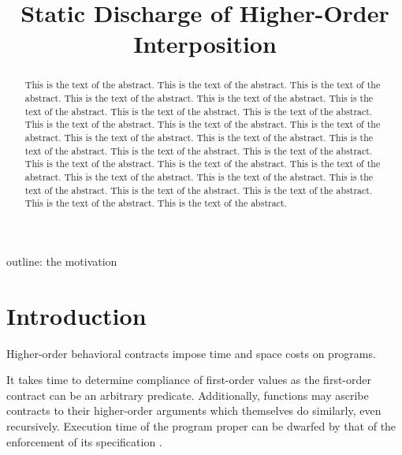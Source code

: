 \documentclass{sigplanconf}
\title{Static Discharge of Higher-Order Interposition}
\begin{document}
\newcommand{\chapcalc}[0]{\ensuremath{\lambda_{\mathcal{C}}}}


\maketitle

\begin{abstract}
This is the text of the abstract.
This is the text of the abstract.
This is the text of the abstract.
This is the text of the abstract.
This is the text of the abstract.
This is the text of the abstract.
This is the text of the abstract.
This is the text of the abstract.
This is the text of the abstract.
This is the text of the abstract.
This is the text of the abstract.
This is the text of the abstract.
This is the text of the abstract.
This is the text of the abstract.
This is the text of the abstract.
This is the text of the abstract.
This is the text of the abstract.
This is the text of the abstract.
This is the text of the abstract.
This is the text of the abstract.
This is the text of the abstract.
This is the text of the abstract.
This is the text of the abstract.
This is the text of the abstract.
This is the text of the abstract.
This is the text of the abstract.
\end{abstract}




outline:
the motivation

\cite{findler2002contracts}
\cite{herman2010space}
\cite{plt-tr1}
\cite{siek2009exploring}
\cite{siek2010threesomes}
\cite{strickland2012chaperones}
\cite{tobin2012higher}
\cite{wadler2009well}

\section{Introduction}

Higher-order behavioral contracts impose time and space costs on programs.

It takes time to determine compliance of first-order values as the first-order contract can be an arbitrary predicate.
Additionally, functions may ascribe contracts to their higher-order arguments which themselves do similarly, even recursively.
Execution time of the program proper can be dwarfed by that of the enforcement of its specification \cite{strickland2012chaperones}.
\end{document}
